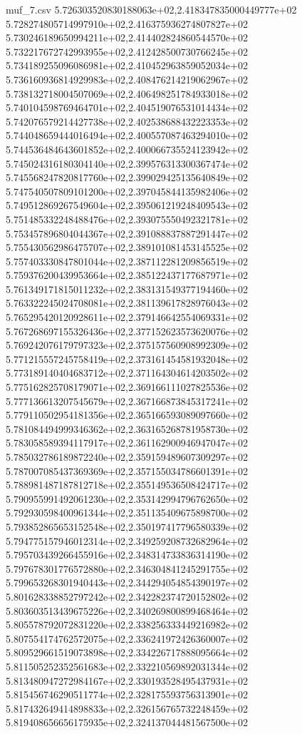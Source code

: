 \begin{filecontents*}{muf_7.csv}
5.726303520830188063e+02,2.418347835000449777e+02
5.728274805714997910e+02,2.416375936274807827e+02
5.730246189650994211e+02,2.414402824860544570e+02
5.732217672742993955e+02,2.412428500730766245e+02
5.734189255096086981e+02,2.410452963859052034e+02
5.736160936814929983e+02,2.408476214219062967e+02
5.738132718004507069e+02,2.406498251784933018e+02
5.740104598769464701e+02,2.404519076531014434e+02
5.742076579214427738e+02,2.402538688432223353e+02
5.744048659444016494e+02,2.400557087463294010e+02
5.744536484643601852e+02,2.400066735524123942e+02
5.745024316180304140e+02,2.399576313300367474e+02
5.745568247820817760e+02,2.399029425135640849e+02
5.747540507809101200e+02,2.397045844135982406e+02
5.749512869267549604e+02,2.395061219248409543e+02
5.751485332248488476e+02,2.393075550492321781e+02
5.753457896804044367e+02,2.391088837887291447e+02
5.755430562986475707e+02,2.389101081453145525e+02
5.757403330847801044e+02,2.387112281209856519e+02
5.759376200439953664e+02,2.385122437177687971e+02
5.761349171815011232e+02,2.383131549377194460e+02
5.763322245024708081e+02,2.381139617828976043e+02
5.765295420120928611e+02,2.379146642554069331e+02
5.767268697155326436e+02,2.377152623573620076e+02
5.769242076179797323e+02,2.375157560908992309e+02
5.771215557245758419e+02,2.373161454581932048e+02
5.773189140404683712e+02,2.371164304614203502e+02
5.775162825708179071e+02,2.369166111027825536e+02
5.777136613207545679e+02,2.367166873845317241e+02
5.779110502954181356e+02,2.365166593089097660e+02
5.781084494999346362e+02,2.363165268781958730e+02
5.783058589394117917e+02,2.361162900946947047e+02
5.785032786189872240e+02,2.359159489607309297e+02
5.787007085437369369e+02,2.357155034786601391e+02
5.788981487187812718e+02,2.355149536508424717e+02
5.790955991492061230e+02,2.353142994796762650e+02
5.792930598400961344e+02,2.351135409675898700e+02
5.793852865653152548e+02,2.350197417796580339e+02
5.794775157946012314e+02,2.349259208732682964e+02
5.795703439266455916e+02,2.348314733836314190e+02
5.797678301776572880e+02,2.346304841245291755e+02
5.799653268301940443e+02,2.344294054854390197e+02
5.801628338852797242e+02,2.342282374720152802e+02
5.803603513439675226e+02,2.340269800899468464e+02
5.805578792072831220e+02,2.338256333449216982e+02
5.807554174762572075e+02,2.336241972426360007e+02
5.809529661519073898e+02,2.334226717888095664e+02
5.811505252352561683e+02,2.332210569892031344e+02
5.813480947272984167e+02,2.330193528495437931e+02
5.815456746290511774e+02,2.328175593756313901e+02
5.817432649414898833e+02,2.326156765732248459e+02
5.819408656656175935e+02,2.324137044481567500e+02

\end{filecontents*}
